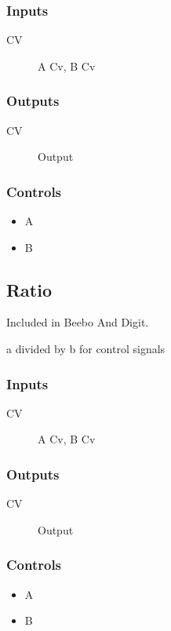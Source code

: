 \subsubsection{Inputs}
\begin{description}
\item [CV] A Cv, B Cv
\end{description}

\subsubsection{Outputs}
\begin{description}
\item [CV] Output
\end{description}

\subsubsection{Controls}
\begin{itemize}
\item A
\item B
\end{itemize}

\subsection{Ratio}

Included in Beebo And Digit.

a divided by b for control signals



\subsubsection{Inputs}
\begin{description}
\item [CV] A Cv, B Cv
\end{description}

\subsubsection{Outputs}
\begin{description}
\item [CV] Output
\end{description}

\subsubsection{Controls}
\begin{itemize}
\item A
\item B
\end{itemize}

